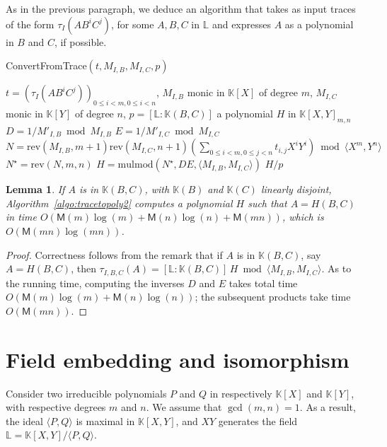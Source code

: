 \documentclass[12pt]{article}
\def\M {\ensuremath{\mathsf{M}}}
\def\K {\ensuremath{\mathbb{K}}}
\def\L {\ensuremath{\mathbb{L}}}
\def\mulmod {\ensuremath{\mathrm{mulmod}}}
\def\rev {\ensuremath{\mathrm{rev}}}
\newtheorem{Lemma}{Lemma}
\begin{document}
As in the previous paragraph, we deduce an algorithm that takes as
input traces of the form $\tau_I(A B^i C^j)$, for some $A,B,C$ in $\L$
and expresses $A$ as a polynomial in $B$ and $C$, if possible.
\begin{algorithm}[H]
  \caption{ConvertFromTrace$(t, M_{I,B}, M_{I,C}, p)$}
  \begin{algorithmic}[1]
    \REQUIRE  $t=(\tau_I(A B^iC^j))_{0 \le i < m, 0 \le i < n}$, $M_{I,B}$ monic in $\K[X]$ of degree $m$,
    $M_{I,C}$ monic in $\K[Y]$ of degree $n$, 
    $p=[\L:\K(B,C)]$
    \ENSURE a polynomial $H$ in $\K[X,Y]_{m,n}$
    \STATE $D =  1/M'_{I,B} \bmod M_{I,B}$
    \STATE $E =  1/M'_{I,C} \bmod M_{I,C}$
    \STATE $N=\rev(M_{I,B}, m+1)\rev(M_{I,C}, n+1)( \sum_{0 \le i <m, 0 \le j < n} t_{i,j} X^iY^i) \bmod \langle X^m, Y^n \rangle$
    \STATE $N^\star = \rev(N, m, n)$
    \STATE $H=\mulmod(N^\star, D E, \langle M_{I,B}, M_{I,C} \rangle)$
    \RETURN $H/p$
  \end{algorithmic}
  \label{algo:tracetopoly2}
\end{algorithm}

\begin{Lemma}
  If $A$ is in $\K(B,C)$, with $\K(B)$ and $\K(C)$ linearly disjoint,
  Algorithm~\ref{algo:tracetopoly2} computes a polynomial $H$ such
  that $A=H(B,C)$ in time $O(\M(m)\log(m)+\M(n)\log(n)+\M(mn))$, which
  is $O(\M(mn)\log(mn))$.
\end{Lemma}
\begin{proof}
  Correctness follows from the remark that if $A$ is in $\K(B,C)$, say
  $A=H(B,C)$, then $\tau_{I,B,C} (A)=[\L:\K(B,C)]\, H \bmod \langle
  M_{I,B}, M_{I,C} \rangle$.  As to the running time, computing
  the inverses $D$ and $E$ takes total time $O(\M(m)\log(m)+\M(n)\log(n))$;
  the subsequent products take time $O(\M(mn))$.
\end{proof}




\section{Field embedding and isomorphism} 

Consider two irreducible polynomials $P$ and $Q$ in respectively
$\K[X]$ and $\K[Y]$, with respective degrees $m$ and $n$. We assume
that $\gcd(m,n)=1$. As a result, the ideal $\langle P, Q\rangle$ is
maximal in $\K[X,Y]$, and $XY$ generates the field $\L=\K[X,Y]/\langle
P, Q \rangle$. 
\end{document}
